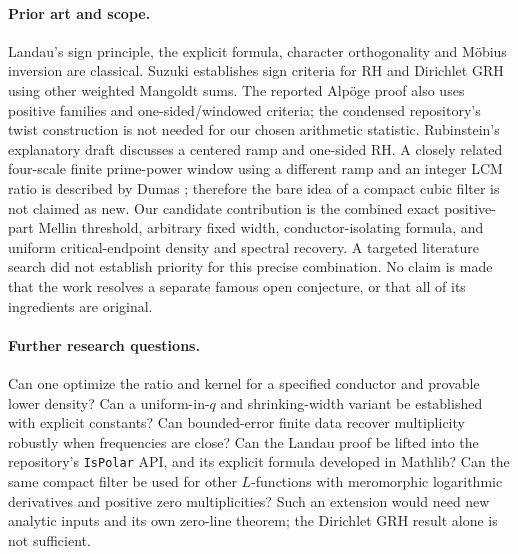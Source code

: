 \documentclass[11pt]{article}
\theoremstyle{remark}\newtheorem{remark}[theorem]{Remark}
\begin{document}
\paragraph{Prior art and scope.} Landau's sign principle, the explicit formula, character orthogonality and M\"obius inversion are classical. Suzuki \cite{suzuki} establishes sign criteria for RH and Dirichlet GRH using other weighted Mangoldt sums. The reported Alp\"oge proof also uses positive families and one-sided/windowed criteria; the condensed repository's twist construction is not needed for our chosen arithmetic statistic. Rubinstein's explanatory draft \cite{rubdraft} discusses a centered ramp and one-sided RH. A closely related four-scale finite prime-power window using a different ramp and an integer LCM ratio is described by Dumas \cite{dumas}; therefore the bare idea of a compact cubic filter is not claimed as new. Our candidate contribution is the combined exact positive-part Mellin threshold, arbitrary fixed width, conductor-isolating formula, and uniform critical-endpoint density and spectral recovery. A targeted literature search did not establish priority for this precise combination. No claim is made that the work resolves a separate famous open conjecture, or that all of its ingredients are original.

\paragraph{Further research questions.} Can one optimize the ratio and kernel for a specified conductor and provable lower density? Can a uniform-in-$q$ and shrinking-width variant be established with explicit constants? Can bounded-error finite data recover multiplicity robustly when frequencies are close? Can the Landau proof be lifted into the repository's \texttt{IsPolar} API, and its explicit formula developed in Mathlib? Can the same compact filter be used for other $L$-functions with meromorphic logarithmic derivatives and positive zero multiplicities? Such an extension would need new analytic inputs and its own zero-line theorem; the Dirichlet GRH result alone is not sufficient.
\end{document}
